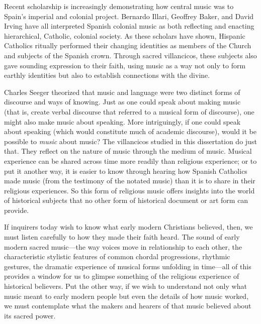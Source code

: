 Recent scholarship is increasingly demonstrating how central music was to Spain's imperial and colonial project.
Bernardo Illari, Geoffrey Baker, and David Irving have all interpreted Spanish colonial music as both reflecting and enacting hierarchical, Catholic, colonial society.%
	\autocites{Illari:Polychoral}{Baker:Harmony}{Irving:Colonial}
As these scholars have shown, Hispanic Catholics ritually performed their changing identities as members of the Church and subjects of the Spanish crown. 
Through sacred villancicos, these subjects also gave sounding expression to their faith, using music as a way not only to form earthly identities but also to establish connections with the divine.

Charles Seeger theorized that music and language were two distinct forms of discourse and ways of knowing.%
	\autocite{Seeger:Unitary}
Just as one could speak about making music (that is, create verbal discourse that referred to a musical form of discourse), one might also make music about speaking.
More intriguingly, if one could speak about speaking (which would constitute much of academic discourse), would it be possible to \emph{music} about music? 
The villancicos studied in this dissertation do just that. 
They reflect on the nature of music through the medium of music.
Musical experience can be shared across time more readily than religious experience; or to put it another way, it is easier to know through hearing how Spanish Catholics made music (from the testimony of the notated music) than it is to share in their religious experiences.
So this form of religious music offers insights into the world of historical subjects that no other form of historical document or art form can provide.

If inquirers today wish to know what early modern Christians believed, then, we must listen carefully to how they made their faith heard.
The sound of early modern sacred music---the way voices move in relationship to each other, the characteristic stylistic features of common chordal progressions, rhythmic gestures, the dramatic experience of musical forms unfolding in time---all of this provides a window for us to glimpse something of the religious experience of historical believers.
Put the other way, if we wish to understand not only what music meant to early modern people but even the details of how music worked, we must contemplate what the makers and hearers of that music believed about its sacred power. 

